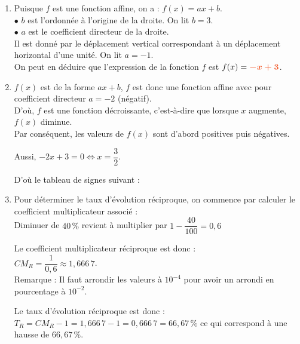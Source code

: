 \documentclass[a4paper,11pt]{article}
\newcounter{seancenum}
\begin{document}
\setcounter{seancenum}{11}
\newpage
\begin{seance}{} %
\begin{enumerate}
\item  Puisque $f$ est une fonction affine, on a : $f(x)=ax+b$.\\$\bullet$ $b$ est l'ordonnée à l'origine de la droite. On lit $b=3$.\\$\bullet$ $a$ est le coefficient directeur de la droite.\\
          Il est donné par le déplacement vertical correspondant à un déplacement horizontal d'une unité. On lit $a=-1$.\\ On peut en déduire que l'expression de la fonction $f$ est $f(x)={\color[HTML]{f15929}\boldsymbol{-x+3}}$.

\item $f(x)$ est de la forme $ax+b$, $f$ est donc une fonction affine avec pour coefficient directeur  $a=-2$  (négatif).\\
             D'où, $f$ est une fonction  décroissante, c'est-à-dire que lorsque $x$ augmente, $f(x)$  diminue. \\
             Par conséquent, les valeurs de $f(x)$ sont d'abord positives puis négatives.

\medskip

             Aussi, $-2x+3=0 \iff x=\dfrac{3}{2}$.

\medskip
 D'où le tableau de signes suivant :\\

\item  Pour déterminer le taux d'évolution réciproque, on commence par calculer le coefficient multiplicateur associé :\\Diminuer de $40\,\%$ revient à multiplier par $ 1 - \dfrac{40}{100} = 0{,}6$ 

\medskip
Le coefficient multiplicateur réciproque est donc : \\$CM_R=\dfrac{1}{0{,}6} \approx 1{,}666\,7$.{\color[HTML]{f15929}\\Remarque : Il faut arrondir les valeurs à $10^{-4}$ pour avoir un arrondi en pourcentage à $10^{-2}$.}

\medskip
 Le taux d'évolution réciproque est donc : \\$T_R=CM_R-1=1{,}666\,7-1=0{,}666\,7=66{,}67\,\%$ ce qui correspond à une hausse de $66{,}67\,\%$.


\end{enumerate}
\end{seance}
\end{document}
